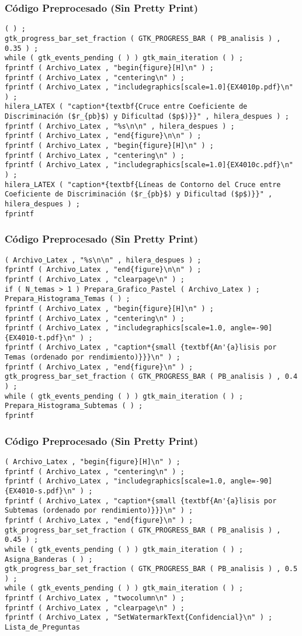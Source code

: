 \documentclass{beamer}
\begin{document}
\begin{frame}[fragile]
\frametitle{C\'odigo Preprocesado (Sin Pretty Print)}
\begin{lstlisting}[style=CStyle]
( ) ; 
gtk_progress_bar_set_fraction ( GTK_PROGRESS_BAR ( PB_analisis ) , 0.35 ) ; 
while ( gtk_events_pending ( ) ) gtk_main_iteration ( ) ; 
fprintf ( Archivo_Latex , "begin{figure}[H]\n" ) ; 
fprintf ( Archivo_Latex , "centering\n" ) ; 
fprintf ( Archivo_Latex , "includegraphics[scale=1.0]{EX4010p.pdf}\n" ) ; 
hilera_LATEX ( "caption*{textbf{Cruce entre Coeficiente de Discriminación ($r_{pb}$) y Dificultad ($p$)}}" , hilera_despues ) ; 
fprintf ( Archivo_Latex , "%s\n\n" , hilera_despues ) ; 
fprintf ( Archivo_Latex , "end{figure}\n\n" ) ; 
fprintf ( Archivo_Latex , "begin{figure}[H]\n" ) ; 
fprintf ( Archivo_Latex , "centering\n" ) ; 
fprintf ( Archivo_Latex , "includegraphics[scale=1.0]{EX4010c.pdf}\n" ) ; 
hilera_LATEX ( "caption*{textbf{Líneas de Contorno del Cruce entre Coeficiente de Discriminación ($r_{pb}$) y Dificultad ($p$)}}" , hilera_despues ) ; 
fprintf \end{lstlisting}
\end{frame}
\begin{frame}[fragile]
\frametitle{C\'odigo Preprocesado (Sin Pretty Print)}
\begin{lstlisting}[style=CStyle]
( Archivo_Latex , "%s\n\n" , hilera_despues ) ; 
fprintf ( Archivo_Latex , "end{figure}\n\n" ) ; 
fprintf ( Archivo_Latex , "clearpage\n" ) ; 
if ( N_temas > 1 ) Prepara_Grafico_Pastel ( Archivo_Latex ) ; 
Prepara_Histograma_Temas ( ) ; 
fprintf ( Archivo_Latex , "begin{figure}[H]\n" ) ; 
fprintf ( Archivo_Latex , "centering\n" ) ; 
fprintf ( Archivo_Latex , "includegraphics[scale=1.0, angle=-90]{EX4010-t.pdf}\n" ) ; 
fprintf ( Archivo_Latex , "caption*{small {textbf{An'{a}lisis por Temas (ordenado por rendimiento)}}}\n" ) ; 
fprintf ( Archivo_Latex , "end{figure}\n" ) ; 
gtk_progress_bar_set_fraction ( GTK_PROGRESS_BAR ( PB_analisis ) , 0.4 ) ; 
while ( gtk_events_pending ( ) ) gtk_main_iteration ( ) ; 
Prepara_Histograma_Subtemas ( ) ; 
fprintf \end{lstlisting}
\end{frame}
\begin{frame}[fragile]
\frametitle{C\'odigo Preprocesado (Sin Pretty Print)}
\begin{lstlisting}[style=CStyle]
( Archivo_Latex , "begin{figure}[H]\n" ) ; 
fprintf ( Archivo_Latex , "centering\n" ) ; 
fprintf ( Archivo_Latex , "includegraphics[scale=1.0, angle=-90]{EX4010-s.pdf}\n" ) ; 
fprintf ( Archivo_Latex , "caption*{small {textbf{An'{a}lisis por Subtemas (ordenado por rendimiento)}}}\n" ) ; 
fprintf ( Archivo_Latex , "end{figure}\n" ) ; 
gtk_progress_bar_set_fraction ( GTK_PROGRESS_BAR ( PB_analisis ) , 0.45 ) ; 
while ( gtk_events_pending ( ) ) gtk_main_iteration ( ) ; 
Asigna_Banderas ( ) ; 
gtk_progress_bar_set_fraction ( GTK_PROGRESS_BAR ( PB_analisis ) , 0.5 ) ; 
while ( gtk_events_pending ( ) ) gtk_main_iteration ( ) ; 
fprintf ( Archivo_Latex , "twocolumn\n" ) ; 
fprintf ( Archivo_Latex , "clearpage\n" ) ; 
fprintf ( Archivo_Latex , "SetWatermarkText{Confidencial}\n" ) ; 
Lista_de_Preguntas \end{lstlisting}
\end{frame}
\end{document}
